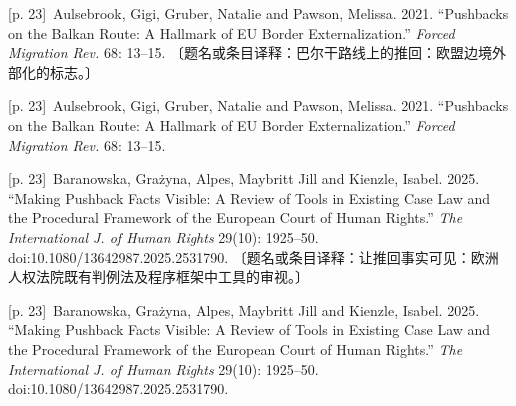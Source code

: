 \documentclass[10pt,a4paper]{article}
\begin{document}
\noindent\begin{minipage}{\textwidth}\begin{minipage}[t]{\dimexpr.5\textwidth-4mm\relax}{\scriptsize\color{gray} [p. 23]}\ Aulsebrook, Gigi, Gruber, Natalie and Pawson, Melissa. 2021. “Pushbacks on the Balkan Route: A Hallmark of EU Border Externalization.” \textit{Forced Migration Rev.} 68: 13–15. 〔题名或条目译释：巴尔干路线上的推回：欧盟边境外部化的标志。〕\par\end{minipage}\hfill\begin{minipage}[t]{\dimexpr.5\textwidth-4mm\relax}{\scriptsize\color{gray} [p. 23]}\ Aulsebrook, Gigi, Gruber, Natalie and Pawson, Melissa. 2021. “Pushbacks on the Balkan Route: A Hallmark of EU Border Externalization.” \textit{Forced Migration Rev.} 68: 13–15.\par\end{minipage}\end{minipage}\par
\noindent\begin{minipage}{\textwidth}\begin{minipage}[t]{\dimexpr.5\textwidth-4mm\relax}{\scriptsize\color{gray} [p. 23]}\ Baranowska, Grażyna, Alpes, Maybritt Jill and Kienzle, Isabel. 2025. “Making Pushback Facts Visible: A Review of Tools in Existing Case Law and the Procedural Framework of the European Court of Human Rights.” \textit{The International J. of Human Rights} 29(10): 1925–50. doi:10.1080/13642987.2025.2531790. 〔题名或条目译释：让推回事实可见：欧洲人权法院既有判例法及程序框架中工具的审视。〕\par\end{minipage}\hfill\begin{minipage}[t]{\dimexpr.5\textwidth-4mm\relax}{\scriptsize\color{gray} [p. 23]}\ Baranowska, Grażyna, Alpes, Maybritt Jill and Kienzle, Isabel. 2025. “Making Pushback Facts Visible: A Review of Tools in Existing Case Law and the Procedural Framework of the European Court of Human Rights.” \textit{The International J. of Human Rights} 29(10): 1925–50. doi:10.1080/13642987.2025.2531790.\par\end{minipage}\end{minipage}\par
\end{document}
